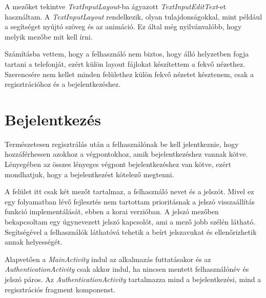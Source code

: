 \documentclass{thesis-ekf}
\theoremstyle{definition}
\theoremstyle{remark}
\begin{document}
A mezőket tekintve \emph{TextInputLayout}-ba ágyazott \emph{TextInputEditText}-et használtam.
A \emph{TextInputLayout} rendelkezik, olyan tulajdonságokkal, mint például a segítséget nyújtó szöveg és az animáció.
Ez által még nyilvánvalóbb, hogy melyik mezőbe mit kell írni.

Számításba vettem, hogy a felhasználó nem biztos, hogy álló helyzetben fogja tartani a telefonját, ezért külön layout fájlokat készítettem a fekvő nézethez.
Szerencsére nem kellet minden felülethez külön fekvő nézetet késztenem, csak a regisztrációhoz és a bejelentkezéshez.

\section{Bejelentkezés}

Természetesen regisztrálás után a felhasználónak be kell jelentkeznie, hogy hozzáférhessen azokhoz a végpontokhoz, amik bejelentkezéshez vannak kötve.
Lényegében az összes lényeges végpont bejelentkezéshez van kötve, ezért mondhatjuk, hogy a bejelentkezést kötelező megtenni.

A felület itt csak két mezőt tartalmaz, a felhasználó nevet és a jelszót.
Mivel ez egy folyamatban lévő fejlesztés nem tartottam prioritásnak a jelszó visszaállítás funkció implementálását, ebben a korai verzióban.
A jelszó mezőben bekapcsoltam egy úgynevezett jelszó kapcsolót, ami a mező jobb szélén látható.
Segítségével a felhasználók láthatóvá tehetik a beírt jelszavukat és ellenőrizhetik annak helyességét.

Alapvetően a \emph{MainActivity} indul az alkalmazás futtatásakor és az \emph{AuthenticationActivity} csak akkor indul, ha nincsen mentett felhasználónév és jelszó páros.
Az \emph{AuthenticationActivity} tartalmazza mind a bejelentkezési, mind a regisztrációs fragment komponenst.
\end{document}
